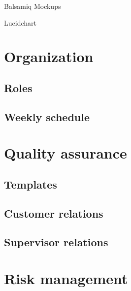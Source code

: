 Balsamiq Mockups

Lucidchart


\section{Organization}
\subsection{Roles}
\subsection{Weekly schedule}

\section{Quality assurance}
\subsection{Templates}
\subsection{Customer relations}
\subsection{Supervisor relations}


\section{Risk management}